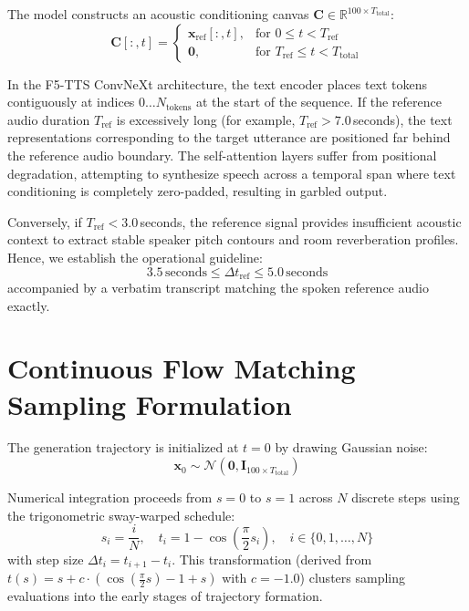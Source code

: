 The model constructs an acoustic conditioning canvas $\mathbf{C} \in \mathbb{R}^{100 \times T_{\text{total}}}$:
\begin{equation}
    \mathbf{C}[:, t] = 
    \begin{cases}
        \mathbf{x}_{\text{ref}}[:, t], & \text{for } 0 \le t < T_{\text{ref}} \\
        \mathbf{0}, & \text{for } T_{\text{ref}} \le t < T_{\text{total}}
    \end{cases}
    \label{eq:acoustic_canvas}
\end{equation}

\begin{remark}
In the F5-TTS ConvNeXt architecture, the text encoder places text tokens contiguously at indices $0 \dots N_{\text{tokens}}$ at the start of the sequence. If the reference audio duration $T_{\text{ref}}$ is excessively long (for example, $T_{\text{ref}} > 7.0$\,seconds), the text representations corresponding to the target utterance are positioned far behind the reference audio boundary. The self-attention layers suffer from positional degradation, attempting to synthesize speech across a temporal span where text conditioning is completely zero-padded, resulting in garbled output.

Conversely, if $T_{\text{ref}} < 3.0$\,seconds, the reference signal provides insufficient acoustic context to extract stable speaker pitch contours and room reverberation profiles. Hence, we establish the operational guideline:
\begin{equation}
    3.5\,\text{seconds} \le \Delta t_{\text{ref}} \le 5.0\,\text{seconds}
    \label{eq:reference_duration_law}
\end{equation}
accompanied by a verbatim transcript matching the spoken reference audio exactly.
\end{remark}

\section{Continuous Flow Matching Sampling Formulation}
The generation trajectory is initialized at $t=0$ by drawing Gaussian noise:
\begin{equation}
    \mathbf{x}_0 \sim \mathcal{N}(\mathbf{0}, \mathbf{I}_{100 \times T_{\text{total}}})
    \label{eq:gaussian_init}
\end{equation}

Numerical integration proceeds from $s=0$ to $s=1$ across $N$ discrete steps using the trigonometric sway-warped schedule:
\begin{equation}
    s_i = \frac{i}{N}, \quad t_i = 1 - \cos\left(\frac{\pi}{2} s_i\right), \quad i \in \{0, 1, \dots, N\}
    \label{eq:sway_steps}
\end{equation}
with step size $\Delta t_i = t_{i+1} - t_i$. This transformation (derived from $t(s) = s + c \cdot (\cos(\frac{\pi}{2} s) - 1 + s)$ with $c = -1.0$) clusters sampling evaluations into the early stages of trajectory formation.

